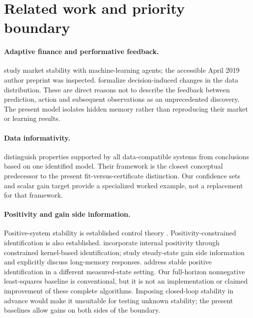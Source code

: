 \documentclass[11pt]{article}
\theoremstyle{remark}\newtheorem{remark}[proposition]{Remark}
\begin{document}
\section{Related work and priority boundary}
\paragraph{Adaptive finance and performative feedback.}
\citet{georges2021} study market stability with machine-learning agents; the accessible April 2019 author preprint was inspected. \citet{perdomo2020} formalize decision-induced changes in the data distribution. These are direct reasons not to describe the feedback between prediction, action and subsequent observations as an unprecedented discovery. The present model isolates hidden memory rather than reproducing their market or learning results.

\paragraph{Data informativity.}
\citet{vanwaarde2020} distinguish properties supported by all data-compatible systems from conclusions based on one identified model. Their framework is the closest conceptual predecessor to the present fit-versus-certificate distinction. Our confidence sets and scalar gain target provide a specialized worked example, not a replacement for that framework.

\paragraph{Positivity and gain side information.}
Positive-system stability is established control theory \citep{rantzer2015}. Positivity-constrained identification is also established. \citet{khosravi2025} incorporate internal positivity through constrained kernel-based identification; \citet{khosravi2022} study steady-state gain side information and explicitly discuss long-memory responses. \citet{umenberger2016} address stable positive identification in a different measured-state setting. Our full-horizon nonnegative least-squares baseline is conventional, but it is not an implementation or claimed improvement of these complete algorithms. Imposing closed-loop stability in advance would make it unsuitable for testing unknown stability; the present baselines allow gains on both sides of the boundary.
\end{document}
